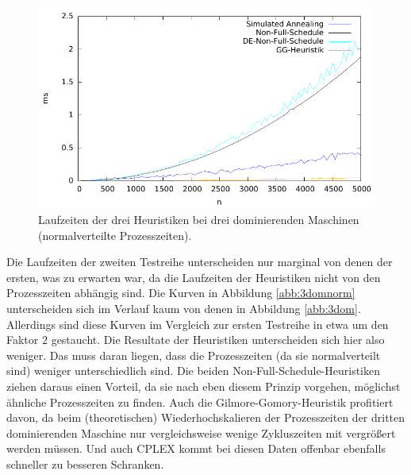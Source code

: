 \documentclass{scrreprt}
\begin{document}
\begin{figure}
    \begin{center}
        \includegraphics[width=.8\textwidth]{../instances/3dom_norm/plottime.pdf}
    \end{center}
    \caption{
        \label{abb:3domnormtime}
        Laufzeiten der drei Heuristiken bei drei dominierenden Maschinen (normalverteilte Prozesszeiten).
    }
\end{figure}

Die Laufzeiten der zweiten Testreihe unterscheiden nur marginal von denen der ersten, was zu erwarten war, 
da die Laufzeiten der Heuristiken nicht von den Prozesszeiten abhängig sind.
Die Kurven in Abbildung \ref{abb:3domnorm} unterscheiden sich im Verlauf kaum von denen in Abbildung \ref{abb:3dom}.
Allerdings sind diese Kurven im Vergleich zur ersten Testreihe in etwa um den Faktor $2$ gestaucht.
Die Resultate der Heuristiken unterscheiden sich hier also weniger.
Das muss daran liegen, dass die Prozesszeiten (da sie normalverteilt sind) weniger unterschiedlich sind.
Die beiden Non-Full-Schedule-Heuristiken ziehen daraus einen Vorteil, da sie nach eben diesem Prinzip vorgehen, möglichst ähnliche Prozesszeiten zu finden.
Auch die Gilmore-Gomory-Heuristik profitiert davon, da beim (theoretischen) Wiederhochskalieren der Prozesszeiten der dritten dominierenden Maschine 
nur vergleichsweise wenige Zykluszeiten mit vergrößert werden müssen.
Und auch CPLEX kommt bei diesen Daten offenbar ebenfalls schneller zu besseren Schranken.
\end{document}
